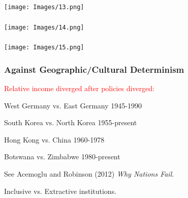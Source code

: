 \documentclass[serif,professionalfont,red,aspectratio=169]{beamer}
\newcommand{\MYhref}[3][blue]{\href{#2}{\color{#1}{#3}}}%
\begin{document}
\begin{frame}[t]
\frametitle{}
\begin{center}
\texttt{[image: Images/13.png]}
\end{center}
\end{frame}
\begin{frame}[t]
\frametitle{}
\begin{center}
\texttt{[image: Images/14.png]}
\end{center}
\end{frame}
\begin{frame}[t]
\frametitle{}
\begin{center}
\texttt{[image: Images/15.png]}
\end{center}
\end{frame}
\begin{frame}[t]
\frametitle{Against Geographic/Cultural Determinism}
\vspace{4mm}
\textcolor{red}{Relative income diverged after policies diverged:}
\vspace{4mm}

\hspace{8mm}West Germany vs. East Germany 1945-1990
\vspace{2mm}

\hspace{8mm}		South Korea vs. North Korea 1955-present
\vspace{2mm}		
		
\hspace{8mm}		Hong Kong vs. China 1960-1978
\vspace{2mm}		
		
\hspace{8mm}		Botswana vs. Zimbabwe 1980-present

\vspace{8mm}		
		
\hspace{8mm}See Acemoglu and Robinson (2012) \textit{Why Nations Fail}.

\vspace{2mm}		
		
\hspace{16mm}Inclusive vs. Extractive institutions.

\vspace{2mm}
\begin{center}
    \MYhref{http://whynationsfail.com/}{WhyNationsFail.com}
\end{center}
\end{frame}
\end{document}
